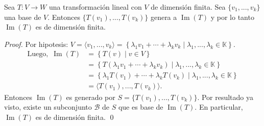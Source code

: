 \documentclass{beamer} %
\newcommand{\im}{\operatorname{Im}}
\renewcommand\nu{\operatorname{Nu}}
\newcommand{\K}{\mathbb K}
\begin{document}
\begin{frame}

    \begin{lema}
    Sea $T:V\longrightarrow W$ una transformación lineal con $V$ de dimensión finita. Sea $\{v_1, ..., v_k\}$ una base de $V$. Entonces $\{T(v_1), ..., T(v_k)\}$ genera a $\im(T)$ y por lo tanto $\im(T)$ es de dimensión finita.
    \end{lema}\pause
    \begin{proof}\pause
        Por hipotesis: $V=\langle v_1, ..., v_k\rangle=\left\{\lambda_1v_1+\cdots+\lambda_k v_k\mid \lambda_1, ..., \lambda_k\in\K\right\}$.
        \begin{align*}
        \mbox{Luego, }\,\im(T)&=\left\{T(v)\mid v\in V\right\}\\
        &=\left\{T(\lambda_1v_1+\cdots+\lambda_kv_k)\mid \lambda_1, ..., \lambda_k\in\K\right\}\\
        &=\left\{\lambda_1T(v_1)+\cdots+\lambda_kT(v_k)\mid \lambda_1, ..., \lambda_k\in\K\right\}\\
        &=\langle T(v_1), ..., T(v_k)\rangle.
        \end{align*}
        Entonces $\im(T)$ es generado por $S=\{T(v_1), ..., T(v_k)\}$. Por resultado ya visto, existe un subconjunto $\mathcal B$ de $S$ que es base de $\im(T)$. En particular, $\im(T)$ es de dimensión finita. \qed     
    \end{proof}
    
    \end{frame}

\end{document}
